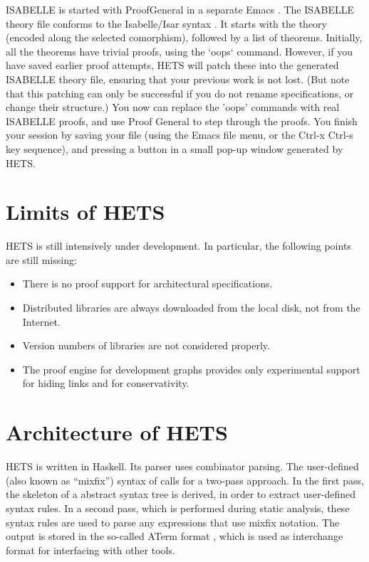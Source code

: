 \documentclass{article}
\newcommand{\normalTEXTSC}[2]{{#1\scriptsize#2}}
\newcommand     {\Hets}{\normalTEXTSC{H}{ETS}\xspace}
\newcommand     {\Isabelle}{\normalTEXTSC{I}{SABELLE}\xspace}
\begin{document}
\Isabelle is started with ProofGeneral
\cite{DBLP:conf/tacas/Aspinall00,url:ProofGeneral} in a separate Emacs
\cite{url:Emacs,url:XEmacs}.
The \Isabelle theory file conforms to the Isabelle/Isar syntax
\cite{NipPauWen02}. It starts with the theory (encoded along the selected
 comorphism), followed by a list of theorems. Initially, all the
 theorems have trivial proofs, using the `oops` command. However, if
 you have saved earlier proof attempts, \Hets will patch these into
 the generated \Isabelle theory file, ensuring that your previous work
 is not lost. (But note that this patching can only be successful
 if you do not rename specifications, or change their structure.)  You
 now can replace the 'oops' commands with real \Isabelle proofs, and
 use Proof General to step through the proofs. You finish your session
 by saving your file (using the Emacs file menu, or the Ctrl-x Ctrl-s
 key sequence), and pressing a button in a small pop-up window
 generated by \Hets.

\section{Limits of \Hets}

\Hets is still intensively under development. In particular, the
following points are still missing:

\begin{itemize}
\item There is no proof support for architectural specifications.
\item Distributed libraries are always downloaded from the local disk,
not from the Internet.
\item Version numbers of libraries are not considered properly.
\item The proof engine for development graphs provides only experimental
support for hiding links and for conservativity.
\end{itemize}


\section{Architecture of \Hets}

\Hets is written in Haskell. Its parser uses combinator 
parsing.
The user-defined (also known as ``mixfix'') syntax of \CASL
calls for a two-pass approach. In the first pass, the skeleton of a
\CASL abstract syntax tree is derived, in order to extract user-defined 
syntax rules. In a second pass, which is performed during 
static
analysis, these syntax rules are used to parse 
any expressions that
use mixfix notation. The output is stored in the so-called
ATerm format \cite{BJKO00}, which is used as interchange format
for interfacing with other tools.
\end{document}
